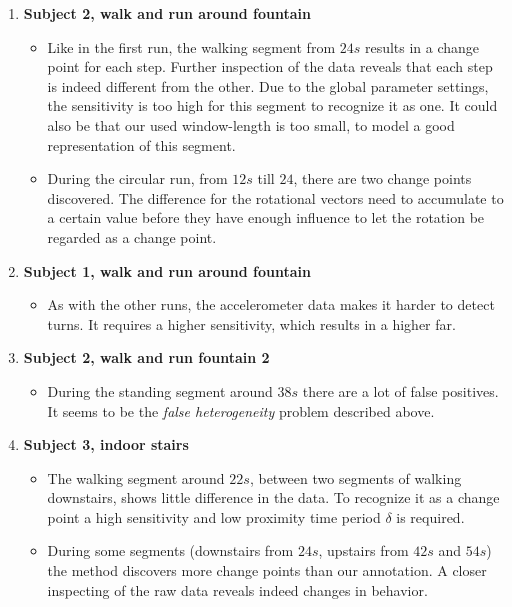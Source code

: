 \begin{enumerate}
  \item \textbf{Subject 2, walk and run around fountain} 
    \begin{itemize}
      \item Like in the first run, the walking segment from $24s$ results in a change point for each step.
      Further inspection of the data reveals that each step is indeed different from the other.
      Due to the global parameter settings, the sensitivity is too high for this segment to recognize it as one.
      It could also be that our used window-length is too small, to model a good representation of this segment.
      \item During the circular run, from $12s$ till $24$, there are two change points discovered.
      The difference for the rotational vectors need to accumulate to a certain value before they have enough influence to let the rotation be regarded as a change point.
    \end{itemize}
  \item \textbf{Subject 1, walk and run around fountain} 
    \begin{itemize}
      \item As with the other runs, the accelerometer data makes it harder to detect turns.
      It requires a higher sensitivity, which results in a higher \gls{far}.
    \end{itemize}
  \item \textbf{Subject 2, walk and run fountain 2} 
    \begin{itemize}
      \item During the standing segment around $38s$ there are a lot of false positives.
      It seems to be the \emph{false heterogeneity} problem described above.
    \end{itemize}
  \item \textbf{Subject 3, indoor stairs} 
    \begin{itemize}
      \item The walking segment around $22s$, between two segments of walking downstairs, shows little difference in the data.
      To recognize it as a change point a high sensitivity and low proximity time period $\delta$ is required.
      \item During some segments (downstairs from $24s$, upstairs from $42s$ and $54s$) the method discovers more change points than our annotation.
      A closer inspecting of the raw data reveals indeed changes in behavior.

\end{itemize}
\end{enumerate}
